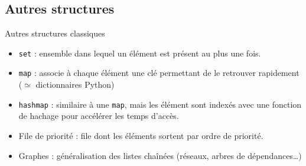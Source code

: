 \subsection{Autres structures}

\begin{frame}{Autres structures classiques}
\begin{itemize}
\item \texttt{set} : ensemble dans lequel un élément est présent au plus une fois.
\item \texttt{map} : associe à chaque élément une clé permettant de le retrouver rapidement ($\simeq$ dictionnaires Python)
\item \texttt{hashmap} : similaire à une \texttt{map}, mais les élément sont indexés avec une fonction de hachage pour accélérer les temps d'accès.
\item File de priorité : file dont les éléments sortent par ordre de priorité.
\item Graphes : généralisation des listes chaînées (réseaux, arbres de dépendances\dots)
\end{itemize}
\end{frame}


